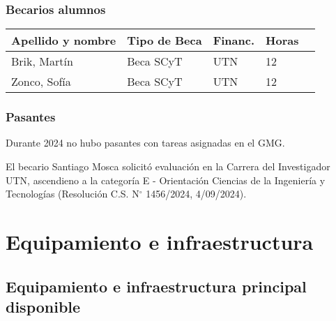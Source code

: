 \documentclass[a4paper,11pt,twoside,final,titlepage,onecolumn,openright]{report}
\begin{document}
\subsubsection{Becarios alumnos}

\begin{tabular}{l l l l r}
\toprule
Apellido y nombre & Tipo de Beca & Financ. & Horas \\
\midrule
Brik, Martín & Beca SCyT & UTN & 12 \\
Zonco, Sofía & Beca SCyT & UTN & 12 \\
\bottomrule 
\end{tabular}

 \subsubsection{Pasantes}

 Durante 2024 no hubo pasantes con tareas asignadas en el GMG.

\normalsize
\vspace{0.5cm}


El becario Santiago Mosca solicitó evaluación en la Carrera del Investigador UTN, ascendieno a la categoría E - Orientación Ciencias de la Ingeniería y Tecnologías (Resolución C.S. N$^{\circ}$ 1456/2024, 4/09/2024).


\section{Equipamiento e infraestructura}

\subsection{Equipamiento e infraestructura principal disponible}
\end{document}
